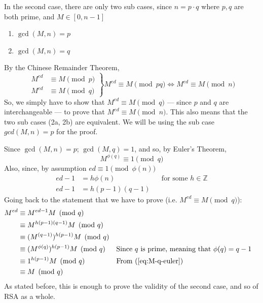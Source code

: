 \documentclass[12pt, titlepage]{article}
\begin{document}
In the second case, there are only two sub cases, since $n = p \cdot q$ where $p, q$ are
both prime, and $ M \in \left[0, n-1\right]$
%
\renewcommand{\labelenumi}{2\alph{enumi}.}
\begin{enumerate}
    \item $\gcd(M, n) = p$
    \item $\gcd(M, n) = q$
\end{enumerate}
%
By the Chinese Remainder Theorem,\autocite[286]{haese_ib_options}
%
\begin{equation*}
    \left.
        \begin{aligned}
            M^{ed} &\equiv M \pmod{p}\\
            M^{ed} &\equiv M \pmod{q}
        \end{aligned}
    \right\}
    M^{ed} \equiv M \pmod{pq} \iff M^{ed} \equiv M \pmod{n}
\end{equation*}
%
So, we simply have to show that $M^{ed} \equiv M \pmod{q}$ --- since $p$ and $q$ are
interchangeable --- to prove that $M^{ed} \equiv M \pmod{n}$. This also means that the two
sub cases (2a, 2b) are equivalent. We will be using the sub case $gcd(M, n) = p$ for the
proof.

Since $\gcd(M, n) = p$; $\gcd(M, q) = 1$, and so, by Euler's Theorem,
%
\begin{equation} \label{eq:M-q-euler} 
    M^{\phi(q)} \equiv 1 \pmod{q} 
\end{equation}
%
Also, since, by assumption $ed \equiv 1 \pmod{\phi(n)}$
%
\begin{align*}
    ed - 1 &= h\phi(n) &&\text{for some } h \in \mathbb{Z}\\
    ed - 1 &= h(p-1)(q-1)
\end{align*}
%
Going back to the statement that we have to prove (i.e. $M^{ed} \equiv M \pmod{q}$):
%
\begin{align*}
    M^{ed} &\equiv M^{ed - 1} M \pmod{q} \\
           &\equiv M^{h(p-1)(q-1)} M \pmod{q} \\
           &\equiv (M^{(q-1)})^{h(p-1)} M \pmod{q} \\
           &\equiv (M^{\phi(q)})^{h(p-1)} M \pmod{q} &&\text{Since $q$ is prime,
           meaning that $\phi(q) = q-1$} \\
           &\equiv 1^{h(p-1)} M \pmod{q} &&\text{From (\ref{eq:M-q-euler})}\\
           &\equiv M \pmod{q}
\end{align*}
%
As stated before, this is enough to prove the validity of the second case, and so of RSA as
a whole.
\end{document}
